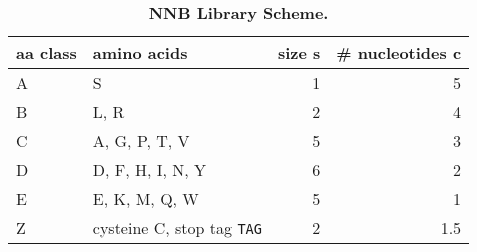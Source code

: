 \begin{table}[!ht]
\captionsetup{labelformat=supp}
\caption{\bf NNB Library Scheme.}
\centering
\begin{tabular}{|l|l|r|r|}\hline
\bf aa class & \bf amino acids & \bf size s & \bf \# nucleotides c \\ \hline
A & S & 1 & 5\\ \hline
B & L, R & 2 & 4\\ \hline
C & A, G, P, T, V & 5 & 3 \\ \hline
D & D, F, H, I, N, Y & 6 & 2 \\ \hline
E & E, K, M, Q, W  & 5 & 1 \\ \hline
Z & cysteine C, stop tag {\tt TAG} & 2 & 1.5\\\hline
\end{tabular}
\end{table}